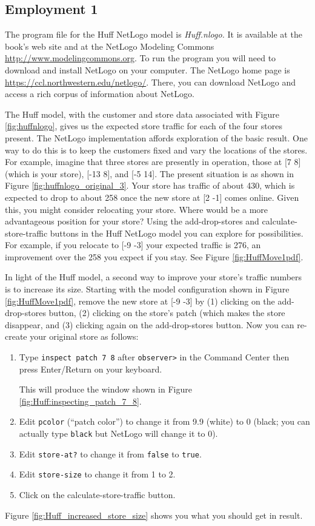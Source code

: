 \subsection{Employment 1\label{sec:Huff:employment_1}}

The program file for the Huff NetLogo model is {\it Huff.nlogo.} It is available at the book's web site and at the NetLogo Modeling Commons 
 \url{http://www.modelingcommons.org}.
 To run the program you will need to download and install NetLogo on your computer.
The NetLogo home page is \url{https://ccl.northwestern.edu/netlogo/}. There, you can download NetLogo and access a rich corpus of information about NetLogo.

The Huff model, with the customer and store data associated with Figure \ref{fig:huffnlogo}, gives us the expected store traffic for each of the four stores present.  The NetLogo implementation affords exploration of the basic result.  One way to do this is to keep the customers fixed and vary the locations of the stores.  For example, imagine that three stores are presently in operation, those at [7 8] (which is your store), [-13 8], and [-5 14]. The present situation is as shown in Figure \ref{fig:huffnlogo_original_3}. Your store has traffic of about 430, which is expected to drop to about 258 once the new store at [2 -1] comes online. Given this, you might consider relocating your store.  Where would be a more advantageous position for your store? Using the add-drop-stores and calculate-store-traffic buttons in the Huff NetLogo model you can explore for possibilities. For example, if you relocate to  [-9 -3] your expected traffic is 276, an improvement over the 258 you expect if you stay. See Figure \ref{fig:HuffMove1pdf}.

In light of the Huff model, a second way to improve your store's traffic numbers is to increase its size. Starting with the model configuration shown in Figure \ref{fig:HuffMove1pdf}, remove the new store at [-9 -3] by (1) clicking on the add-drop-stores button, (2) clicking on the store's patch (which makes the store disappear, and (3) clicking again on the add-drop-stores button. Now you can re-create your original store as follows:
\begin{enumerate}
\item Type {\tt inspect patch 7 8} after {\tt observer>} in the Command Center then press Enter/Return on your keyboard.

This will produce the window shown in Figure \ref{fig:Huff:inspecting_patch_7_8}.
\item Edit {\tt pcolor} (``patch color'') to change it from 9.9 (white) to 0 (black; you can actually type {\tt black} but NetLogo will change it to 0).
\item Edit {\tt store-at?} to change it from {\tt false} to {\tt true}.
\item Edit {\tt store-size} to change it from 1 to 2.
\item Click on the calculate-store-traffic button.  
\end{enumerate}
Figure \ref{fig:Huff_increased_store_size} shows you what you should get in result.



